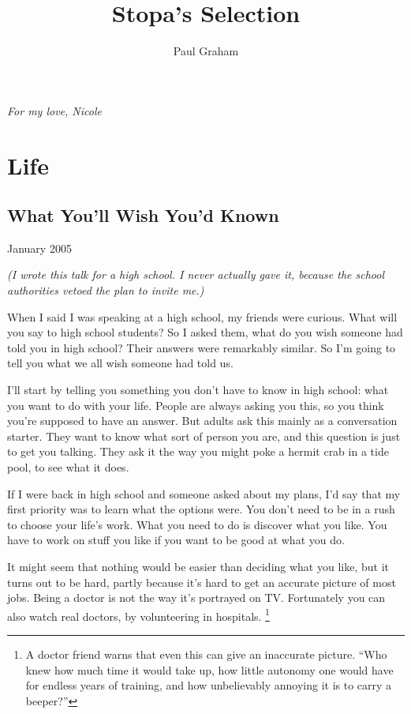 \documentclass[12pt]{book}
\title{Stopa's Selection}
\author{Paul Graham}
\date{}
\begin{document}
\frontmatter
\maketitle
\tableofcontents
\clearpage
\mainmatter

\cleardoublepage\n\thispagestyle{empty}\n\vspace*{\fill}\n\begin{center}\n\textit{For my love, Nicole}\n\end{center}\n\vspace*{\fill}\n\clearpage
\part{Life}
\chapter{What You'll Wish You'd Known}

January 2005

\emph{(I wrote this talk for a high school. I never actually gave it,
because the school authorities vetoed the plan to invite me.)}

When I said I was speaking at a high school, my friends were curious.
What will you say to high school students? So I asked them, what do you
wish someone had told you in high school? Their answers were remarkably
similar. So I'm going to tell you what we all wish someone had told us.

I'll start by telling you something you don't have to know in high
school: what you want to do with your life. People are always asking you
this, so you think you're supposed to have an answer. But adults ask
this mainly as a conversation starter. They want to know what sort of
person you are, and this question is just to get you talking. They ask
it the way you might poke a hermit crab in a tide pool, to see what it
does.

If I were back in high school and someone asked about my plans, I'd say
that my first priority was to learn what the options were. You don't
need to be in a rush to choose your life's work. What you need to do is
discover what you like. You have to work on stuff you like if you want
to be good at what you do.

It might seem that nothing would be easier than deciding what you like,
but it turns out to be hard, partly because it's hard to get an accurate
picture of most jobs. Being a doctor is not the way it's portrayed on
TV. Fortunately you can also watch real doctors, by volunteering in
hospitals. \footnote{A doctor friend warns that even this can give an inaccurate
picture. ``Who knew how much time it would take up, how little autonomy
one would have for endless years of training, and how unbelievably
annoying it is to carry a beeper?''}
\end{document}
